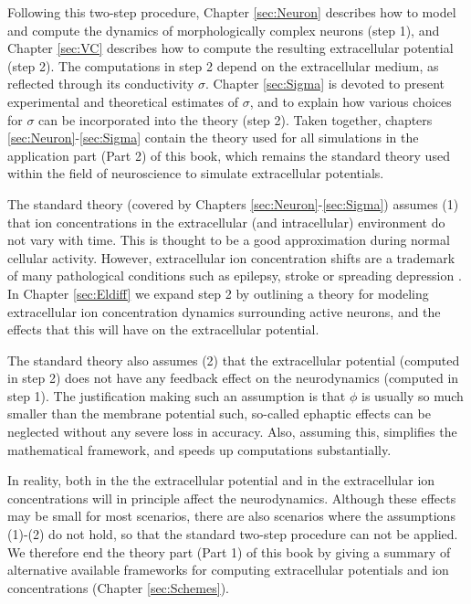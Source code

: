 {Following this two-step procedure, Chapter \ref{sec:Neuron} describes how to model and compute the dynamics of morphologically complex neurons (step 1), and Chapter \ref{sec:VC} describes how to compute the resulting extracellular potential (step 2). The computations in step 2 depend on the extracellular medium, as reflected through its conductivity $\sigma$. Chapter \ref{sec:Sigma} is devoted to present experimental and theoretical estimates of $\sigma$, and to explain how various choices for $\sigma$ can be incorporated into the theory (step 2). Taken together, chapters \ref{sec:Neuron}-\ref{sec:Sigma} contain the theory used for all simulations in the application part (Part 2) of this book, which remains the standard theory used within the field of neuroscience to simulate extracellular potentials. 

The standard theory (covered by Chapters \ref{sec:Neuron}-\ref{sec:Sigma}) assumes (1) that ion concentrations in the extracellular (and intracellular) environment do not vary with time. This is thought to be a good approximation during normal cellular activity. However, extracellular ion concentration shifts are a trademark of many pathological conditions such as epilepsy, stroke or spreading depression \citep{Somjen2001, Frohlich2008, Zandt2015review, Ayata2015}. In Chapter \ref{sec:Eldiff} we expand step 2 by outlining a theory for modeling extracellular ion concentration dynamics surrounding active neurons, and the effects that this will have on the extracellular potential. 

The standard theory also assumes (2) that the extracellular potential (computed in step 2) does not have any feedback effect on the neurodynamics (computed in step 1). The justification making such an assumption is that $\phi$ is usually so much smaller than the membrane potential such, so-called ephaptic effects can be neglected without any severe loss in accuracy. Also, assuming this, simplifies the mathematical framework, and speeds up computations substantially. 

In reality, both in the the extracellular potential and in the extracellular ion concentrations will in principle affect the neurodynamics. Although these effects may be small for most scenarios, there are also scenarios where the assumptions (1)-(2) do not hold, so that the standard two-step procedure can not be applied. We therefore end the theory part (Part 1) of this book by giving a summary of alternative available frameworks for computing extracellular potentials and ion concentrations (Chapter \ref{sec:Schemes}).

}
